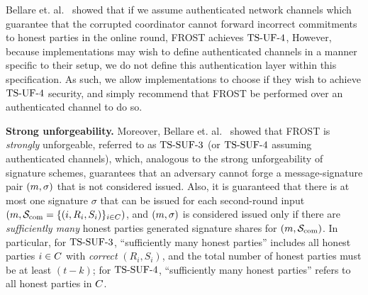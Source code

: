 Bellare et. al.~\cite{BellareCKMTZ22} showed that if we assume authenticated network channels which guarantee that the corrupted coordinator cannot forward incorrect commitments to honest parties in the online round,
FROST achieves $\mathrm{TS}\mbox{-}\mathrm{UF}\mbox{-}{4}$,
However, because implementations may wish to define authenticated channels in a manner specific to their setup,
we do not define this authentication layer within this specification.
As such,
we allow implementations to choose if they wish to achieve $\mathrm{TS}\mbox{-}\mathrm{UF}\mbox{-}{4}$ security,
and simply recommend that FROST be performed over an authenticated channel to do so.

\medskip
\textbf{Strong unforgeability.} Moreover, Bellare et. al.~\cite{BellareCKMTZ22} showed that FROST is \emph{strongly} unforgeable, referred to as $\mathrm{TS}\mbox{-}\mathrm{SUF}\mbox{-}{3}$ (or $\mathrm{TS}\mbox{-}\mathrm{SUF}\mbox{-}{4}$ assuming authenticated channels), which, analogous to the strong unforgeability of signature schemes, guarantees that an adversary cannot forge a message-signature pair $(m,\sigma)$ that is not considered issued.
Also, it is guaranteed that there is at most one signature $\sigma$ that can be issued for each second-round input $(m, \mathcal{S}_{\rm com}=\{ (i, R_{i}, S_{i})\}_{i \in C})$, and $(m, \sigma)$ is considered issued only if there are \emph{sufficiently many} honest parties generated signature shares for $(m, \mathcal{S}_{\rm com})$.
In particular, for $\mathrm{TS}\mbox{-}\mathrm{SUF}\mbox{-}{3}$, ``sufficiently many honest parties'' includes all honest parties $i\in C$ with \emph{correct} $(R_{i}, S_{i})$, and the total number of honest parties must be at least $(t - k)$; for $\mathrm{TS}\mbox{-}\mathrm{SUF}\mbox{-}{4}$, ``sufficiently many honest parties'' refers to all honest parties in $C$.




